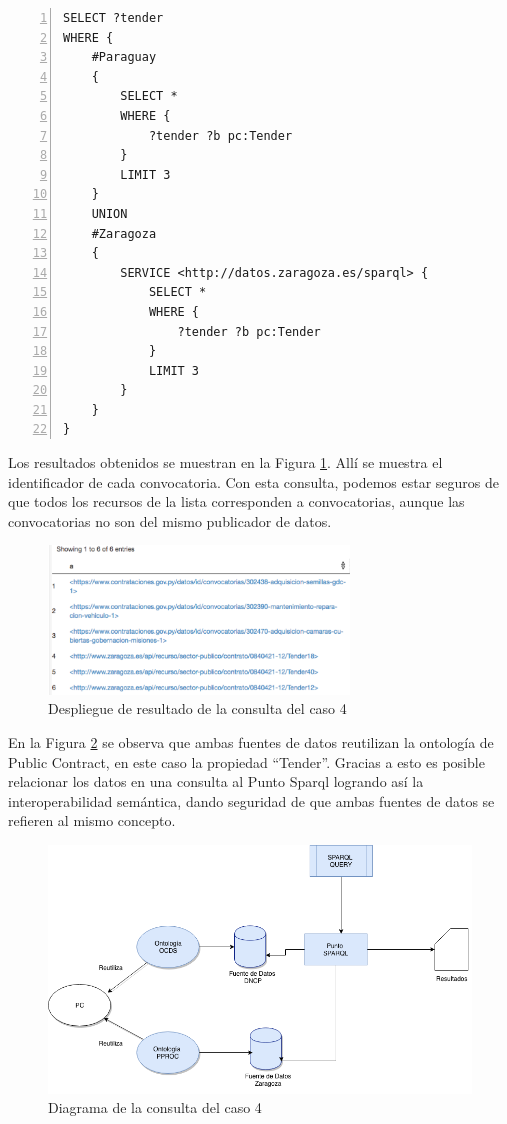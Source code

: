 \noindent\begin{minipage}[c]{\textwidth}
 \begin{lstlisting}[captionpos=b, caption=Consulta a dos fuentes de datos utilizando el mismo concepto, label={lst:caso4-2},  numbers=left,  numberstyle=\tiny\color{mygray},frame=single]
SELECT ?tender
WHERE {
    #Paraguay
    { 
        SELECT * 
        WHERE {
            ?tender ?b pc:Tender 
        } 
        LIMIT 3 
    }
    UNION 
    #Zaragoza
    { 
        SERVICE <http://datos.zaragoza.es/sparql> {
            SELECT * 
            WHERE {
                ?tender ?b pc:Tender 
            } 
            LIMIT 3
        }
    }
}
 \end{lstlisting}
\end{minipage}
 Los resultados obtenidos se muestran en la Figura \ref{img:caso4Resultado}. Allí se muestra el identificador de cada convocatoria. Con esta consulta, podemos estar seguros de que todos los recursos de la lista corresponden a convocatorias, aunque las convocatorias no son del mismo publicador de datos.



\begin{figure}[ht!]
    \centering
    \includegraphics[width=80mm]{figuras/caso4Resultado.png}
    \caption{Despliegue de resultado de la consulta del caso 4}
    \label{img:caso4Resultado}
 \end{figure}

 En la Figura \ref{img:Diagramas-Caso 4} se observa que ambas fuentes de datos reutilizan la ontología de Public Contract, en este caso la propiedad “Tender”. Gracias a esto es posible relacionar los datos en una consulta al Punto Sparql logrando así la interoperabilidad semántica, dando seguridad de que ambas fuentes de datos se refieren al mismo concepto.

 \begin{figure}[ht!]
    \centering
    \includegraphics[width=150mm]{figuras/Diagramas-Caso4.png}
    \caption{Diagrama de la consulta del caso 4}
    \label{img:Diagramas-Caso 4}
 \end{figure}

